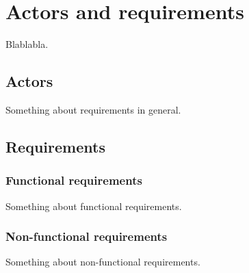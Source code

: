 \chapter{Actors and requirements}
Blablabla.

\section{Actors}
Something about requirements in general.

\section{Requirements}

\subsection{Functional requirements}
Something about functional requirements.

\subsection{Non-functional requirements}
Something about non-functional requirements.

